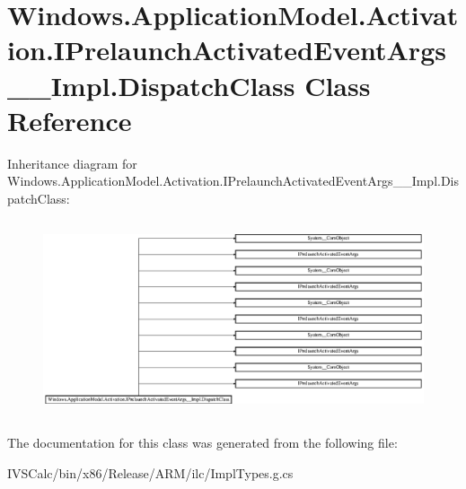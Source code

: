 \hypertarget{class_windows_1_1_application_model_1_1_activation_1_1_i_prelaunch_activated_event_args_____impl_1_1_dispatch_class}{}\section{Windows.\+Application\+Model.\+Activation.\+I\+Prelaunch\+Activated\+Event\+Args\+\_\+\+\_\+\+Impl.\+Dispatch\+Class Class Reference}
\label{class_windows_1_1_application_model_1_1_activation_1_1_i_prelaunch_activated_event_args_____impl_1_1_dispatch_class}
Inheritance diagram for Windows.\+Application\+Model.\+Activation.\+I\+Prelaunch\+Activated\+Event\+Args\+\_\+\+\_\+\+Impl.\+Dispatch\+Class\+:\begin{figure}[H]
\begin{center}
\leavevmode
\includegraphics[height=5.822306cm]{class_windows_1_1_application_model_1_1_activation_1_1_i_prelaunch_activated_event_args_____impl_1_1_dispatch_class}
\end{center}
\end{figure}


The documentation for this class was generated from the following file\+:\begin{DoxyCompactItemize}
\item 
I\+V\+S\+Calc/bin/x86/\+Release/\+A\+R\+M/ilc/Impl\+Types.\+g.\+cs\end{DoxyCompactItemize}
